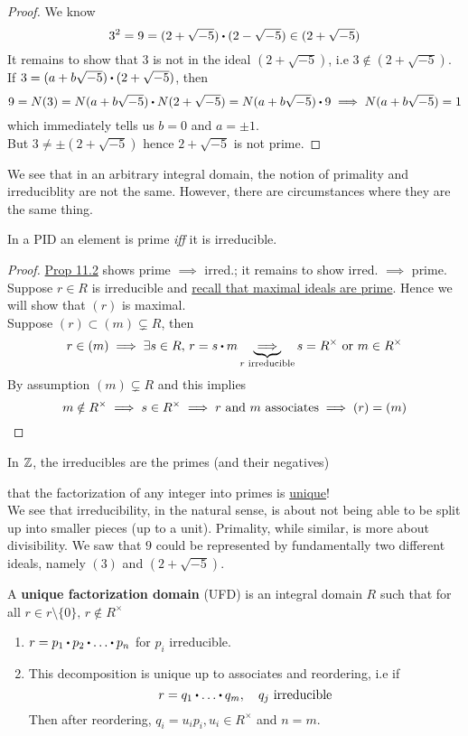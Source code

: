 \documentclass[../Main.tex]{subfiles}
\begin{document}
\begin{proof}
	We know
	\[3^2=9=(2+\sqrt{-5})\rdot (2-\sqrt{-5}) \in (2+\sqrt{-5})\]
	It remains to show that $3$ is not in the ideal $(2+\sqrt{-5})$, i.e $3\notin (2+\sqrt{-5})$.
	If $3=(a+b\sqrt{-5})\rdot (2+\sqrt{-5})$, then 
	\[9=N(3)=N(a+b\sqrt{-5})\rdot N(2+\sqrt{-5}) =N(a+b\sqrt{-5})\rdot 9 \implies N(a+b\sqrt{-5}) =1 \]
	which immediately tells us $b=0$ and $a=\pm 1$.\\
	But $3\ne \pm  (2+\sqrt{-5})$ hence $2+\sqrt{-5}$ is not prime.
\end{proof}
We see that in an arbitrary integral domain, the notion of primality and irreduciblity are not the same. However, there are circumstances where they are the same thing.
\begin{prop}[title = Element in PID is prime iff it is irreducible]
	In a PID an element is prime \textit{iff} it is irreducible.
\end{prop}
\begin{proof}
	\hyperref[prop:11.2]{Prop 11.2} shows prime $\implies$ irred.; it remains to show irred. $\implies$ prime.\\
	Suppose $r\in R$ is irreducible and \hyperref[co:7.9]{recall that maximal ideals are prime}. Hence we will show that $(r)$ is maximal.\\
	Suppose $(r)\subset (m)\subsetneq R$, then
	\[r\in (m) \implies \exists s\in R,\, r=s\rdot m \underbrace{\implies}_{r \text{ irreducible} } s=R^\times \text{ or } m\in R^\times\]
	By assumption $(m)\subsetneq R$ and this implies
	\[m\notin R^\times \implies s\in R^\times \implies r \text{ and } m \text{ associates} \implies (r) = (m)\qedhere\]
\end{proof}
\begin{example}
	In $\mathbb{Z}$, the irreducibles are the primes (and their negatives)
\end{example}
\Obs that the factorization of any integer into primes is \underline{unique}!\\
We see that irreducibility, in the natural sense, is about not being able to be split up into smaller pieces (up to a unit). Primality, while similar, is more about divisibility. We saw that $9$ could be represented by fundamentally two different ideals, namely $(3)$ and $(2+\sqrt{-5})$.
\begin{dfn}[title = Unique Factorization Domain]
	A \textbf{unique factorization domain} (UFD) is an integral domain $R$ such that for all $r\in r\setminus \{0\},\, r\notin R^\times$
	\begin{enumerate}
		\item $r=p_1\rdot p_2\rdot \dots\rdot p_n$ for $p_i$ irreducible.
		\item This decomposition is unique up to associates and reordering, i.e if 
		\[r=q_1\rdot \dots \rdot q_m,\quad q_j \text{ irreducible}\]
		Then after reordering, $q_i=u_ip_i, u_i\in R^\times$ and $n=m$.
	\end{enumerate}
\end{dfn}
\end{document}
